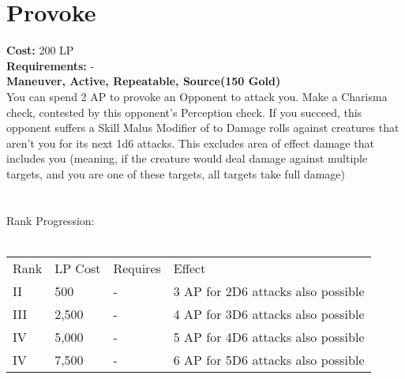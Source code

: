 \section{Provoke}\label{maneuver:provoke}
\textbf{Cost:} 200 LP\\
\textbf{Requirements:} -\\
\textbf{Maneuver, Active, Repeatable, Source(150 Gold)}\\
You can spend 2 AP to provoke an Opponent to attack you.
Make a Charisma check, contested by this opponent's Perception check.
If you succeed, this opponent suffers a Skill Malus Modifier of  to Damage rolls against creatures that aren't you for its next 1d6 attacks.
This excludes area of effect damage that includes you (meaning, if the creature would deal damage against multiple targets, and you are one of these targets, all targets take full damage)\\
\\
\\
Rank Progression:\\
\\
\begin{tabular}{l | l | l | l}
	Rank & LP Cost & Requires & Effect\\
	II & 500 & - & 3 AP for 2D6 attacks also possible\\
	III & 2,500 & - & 4 AP for 3D6 attacks also possible\\
	IV & 5,000 & - & 5 AP for 4D6 attacks also possible\\
	IV & 7,500 & - & 6 AP for 5D6 attacks also possible\\
\end{tabular}